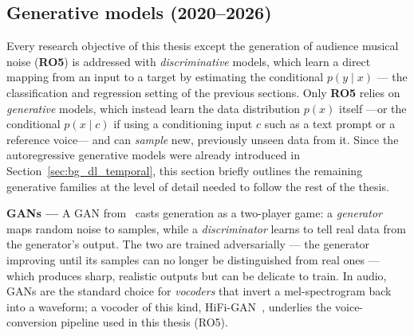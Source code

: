 \subsection{Generative models (2020--2026)}
\label{sec:bg_dl_generative}

Every research objective of this thesis except the generation of audience musical noise (\textbf{RO5}) is addressed
with \emph{discriminative} models, which learn a direct mapping from an
input to a target by estimating the conditional $p(y \mid x)$ --- the
classification and regression setting of the previous sections. Only
\textbf{RO5} relies on \emph{generative} models, which instead learn the
data distribution $p(x)$ itself ---or the conditional $p(x \mid c)$ if using a conditioning input $c$ such
as a text prompt or a reference voice--- and can
\emph{sample} new, previously unseen data from it. Since the autoregressive
generative models were already introduced in
Section~\ref{sec:bg_dl_temporal}, this section briefly outlines the remaining
generative families at the level of detail needed to follow the rest of
the thesis.

\textbf{GANs ---} A \acrfull{GAN} from~\citep{goodfellow2014generative} casts
generation as a two-player game: a \emph{generator} maps random noise to
samples, while a \emph{discriminator} learns to tell real data from the
generator's output. The two are trained adversarially --- the generator
improving until its samples can no longer be distinguished from real ones
--- which produces sharp, realistic outputs but can be delicate to train.
In audio, \acrshort{GAN}s are the standard choice for \emph{vocoders} that
invert a mel-spectrogram back into a waveform; a vocoder of this kind,
HiFi-GAN~\citep{kong2020hifi}, underlies the voice-conversion pipeline
used in this thesis (RO5).


